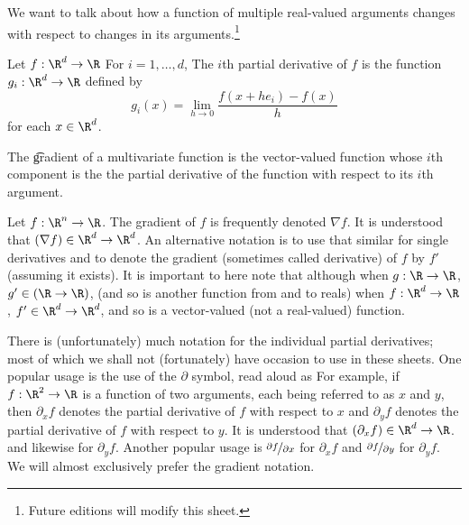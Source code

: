 

We want to talk about how a function
of multiple real-valued arguments
changes with respect to changes
in its arguments.\footnote{Future editions will modify this sheet.}


Let $f: \R^d \to \R$
For $i = 1,\dots,d$,
The \t{$i$th partial derivative} of $f$ is the function $g_i: \R^d \to \R$ defined by
\[
  g_i(x) = \lim_{h \to 0} \frac{f(x + he_i) - f(x)}{h}
\]
for each $x \in \R^d$.




The \t{gradient} of a multivariate function is the vector-valued function whose $i$th component is the the partial derivative of the function with respect to its $i$th argument.


Let $f: \R^n \to \R$.
The gradient of $f$ is frequently denoted $\nabla f$.
It is understood that $(\nabla f) \in \R^d \to \R^d$.
An alternative notation is to use that similar for single derivatives and to denote the gradient (sometimes called derivative) of $f$ by $f'$ (assuming it exists).
It is important to here note that although when $g: \R \to \R$, $g' \in (\R \to \R)$, (and so is another function from and to reals) when $f: \R^d \to \R$, $f' \in \R^d \to \R^d$, and so is a vector-valued (not a real-valued) function.

There is (unfortunately) much notation for the individual partial derivatives; most of which we shall not (fortunately) have occasion to use in these sheets.
One popular usage is the use of the $\partial$ symbol, read aloud as 
For example, if $f: \R^2 \to \R$ is a function of two arguments, each being referred to as $x$ and $y$, then $\partial_x f$ denotes the partial derivative of $f$ with respect to $x$ and $\partial_y f$ denotes the partial derivative of $f$ with respect to $y$.
It is understood that $(\partial_x f) \in \R^d \to \R$. and likewise for $\partial_y f$.
Another popular usage is $\nicefrac{\partial f}{\partial x}$ for $\partial_x f$ and $\nicefrac{\partial f}{\partial y}$ for $\partial_y f$.
We will almost exclusively prefer the gradient notation.
